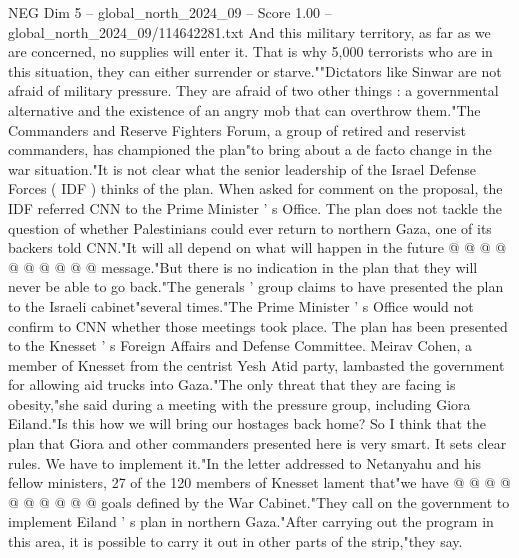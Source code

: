 \begin{textsample}{NEG Dim 5 – global\_north\_2024\_09 – Score 1.00 – global\_north\_2024\_09/114642281.txt}
And this military territory, as far as we are concerned, no supplies will enter it.
That is why 5,000 terrorists who are in this situation, they can either surrender or starve.""Dictators like Sinwar are not afraid of military pressure.
They are afraid of two other things : a governmental alternative and the existence of an angry mob that can overthrow them."The Commanders and Reserve Fighters Forum, a group of retired and reservist commanders, has championed the plan"to bring about a de facto change in the war situation."It is not clear what the senior leadership of the Israel Defense Forces ( IDF ) thinks of the plan.
When asked for comment on the proposal, the IDF referred CNN to the Prime Minister ' s Office.
The plan does not tackle the question of whether Palestinians could ever return to northern Gaza, one of its backers told CNN."It will all depend on what will happen in the future @ @ @ @ @ @ @ @ @ @ message."But there is no indication in the plan that they will never be able to go back."The generals ' group claims to have presented the plan to the Israeli cabinet"several times."The Prime Minister ' s Office would not confirm to CNN whether those meetings took place.
The plan has been presented to the Knesset ' s Foreign Affairs and Defense Committee.
Meirav Cohen, a member of Knesset from the centrist Yesh Atid party, lambasted the government for allowing aid trucks into Gaza."The only threat that they are facing is obesity,"she said during a meeting with the pressure group, including Giora Eiland."Is this how we will bring our hostages back home?
So I think that the plan that Giora and other commanders presented here is very smart.
It sets clear rules.
We have to implement it."In the letter addressed to Netanyahu and his fellow ministers, 27 of the 120 members of Knesset lament that"we have @ @ @ @ @ @ @ @ @ @ goals defined by the War Cabinet."They call on the government to implement Eiland ' s plan in northern Gaza."After carrying out the program in this area, it is possible to carry it out in other parts of the strip,"they say.

\end{textsample}
